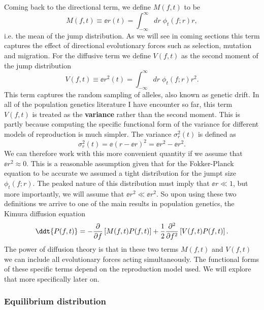 Coming back to the directional term, we define $M(f, t)$ to be
\begin{equation}
  M(f, t) \equiv \ee{r(t)} = \int_{-\infty}^{\infty} dr \; \phi_t(f; r) r,
\end{equation}
i.e. the mean of the jump distribution. As we will see in coming sections this
term captures the effect of directional evolutionary forces such as selection,
mutation and migration. For the diffusive term we define $V(f, t)$ as the
second moment of the jump distribution
\begin{equation}
  V(f, t) \equiv \ee{r^2(t)} = \int_{-\infty}^{\infty} dr \; \phi_t(f; r) r^2.
\end{equation}
This term captures the random sampling of alleles, also known as genetic drift.
In all of the population genetics literature I have encounter so far, this term
$V(f, t)$ is treated as the \textbf{variance} rather than the second moment.
This is partly because computing the specific functional form of the variance
for different models of reproduction is much simpler. The variance
$\sigma_r^2(t)$ is defined as
\begin{equation}
  \sigma_r^2(t) = \ee{\left( r - \ee{r} \right)^2} = \ee{r^2} - \ee{r}^2.
\end{equation}
We can therefore work with this more convenient quantity if we assume that
$\ee{r}^2 \approx 0$. This is a reasonable assumption given that for the
Fokker-Planck equation to be accurate we assumed a tight distribution for the
jumpt size $\phi_t(f; r)$. The peaked nature of this distribution must imply
that $\ee{r} \ll 1$, but more importantly, we will assume that
$\ee{r}^2 \ll \ee{r^2}$. So upon using these two definitions we arrive to one
of the main results in population genetics, the Kimura diffusion equation
\begin{equation}
  \ddt{P(f, t)} = - {\partial \over \partial f}
  \left[
  M(f, t) P(f, t)
  \right] +
  {1 \over 2}{\partial^2 \over \partial f^2}
  \left[
  V(f, t) P(f, t)
  \right].
  \label{eq_kimura_diffusion}
\end{equation}
The power of diffusion theory is that in these two terms $M(f, t)$ and $V(f,
t)$ we can include all evolutionary forces acting simultaneously. The
functional forms of these specific terms depend on the reproduction model used.
We will explore that more specifically later on.

\subsubsection{Equilibrium distribution}

